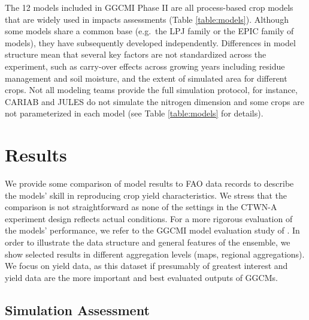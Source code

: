 \documentclass[gmd, manuscript]{copernicus} %
\begin{document}
The 12 models included in GGCMI Phase II are all process-based crop models that are widely used in impacts assessments (Table \ref{table:models}). 
Although some models share a common base (e.g.\ the LPJ family or the EPIC family of models), they have subsequently developed independently. 
Differences in model structure mean that several key factors are not standardized across the experiment, such as carry-over effects across growing years including residue management and soil moisture, and the extent of simulated area for different crops. 
Not all modeling teams provide the full simulation protocol, for instance, CARIAB and JULES do not simulate the nitrogen dimension and some crops are not parameterized in each model (see Table \ref{table:models} for details). 

\section{Results}

We provide some comparison of model results to FAO data records to describe the models' skill in reproducing crop yield characteristics. 
We stress that the comparison is not straightforward as none of the settings in the CTWN-A experiment design reflects actual conditions. 
For a more rigorous evaluation of the models' performance, we refer to the GGCMI model evaluation study of \citet{muller_global_2017}. In order to illustrate the data structure and general features of the ensemble, we show selected results in different aggregation levels (maps, regional aggregations). 
We focus on yield data, as this dataset if presumably of greatest interest and yield data are the more important and best evaluated outputs of GGCMs.

\subsection{Simulation Assessment}
\label{S:3}
\end{document}
